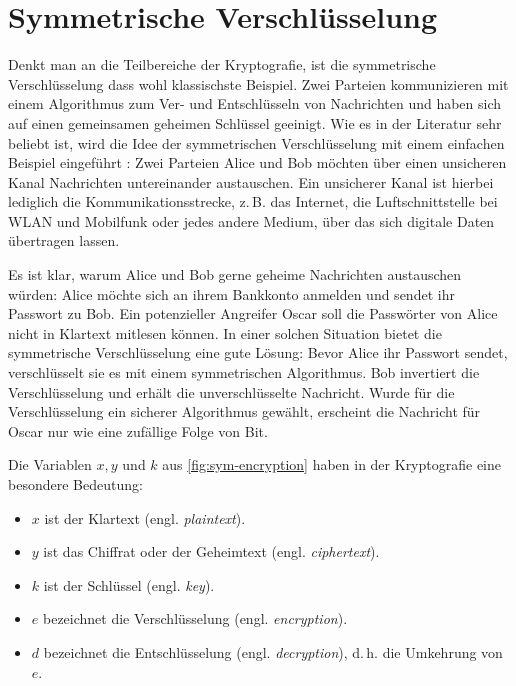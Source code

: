 \section{Symmetrische Verschlüsselung}
Denkt man an die Teilbereiche der Kryptografie, ist die symmetrische Verschlüsselung
dass wohl klassischste Beispiel. Zwei Parteien kommunizieren mit einem
Algorithmus zum Ver- und Entschlüsseln von Nachrichten und haben sich auf einen
gemeinsamen geheimen Schlüssel geeinigt. Wie es in der Literatur sehr beliebt ist,
wird die Idee der symmetrischen Verschlüsselung
mit einem einfachen Beispiel eingeführt \parencite[4-6]{BOOK:crypto}:
Zwei Parteien Alice und Bob möchten über einen unsicheren Kanal Nachrichten untereinander austauschen.
Ein unsicherer Kanal ist hierbei lediglich die Kommunikationsstrecke,
z.\,B. das Internet, die Luftschnittstelle bei WLAN und Mobilfunk
oder jedes andere Medium, über das sich digitale Daten übertragen lassen.
\newpage



\noindent
Es ist klar, warum Alice und Bob gerne geheime Nachrichten austauschen würden: Alice möchte sich an ihrem
Bankkonto anmelden und sendet ihr Passwort zu Bob. Ein potenzieller Angreifer Oscar
soll die Passwörter von Alice nicht in Klartext mitlesen können.
In einer solchen Situation bietet die symmetrische Verschlüsselung eine gute Lösung:
Bevor Alice ihr Passwort sendet, verschlüsselt sie es mit einem symmetrischen Algorithmus.
Bob invertiert die Verschlüsselung und erhält die unverschlüsselte Nachricht. Wurde für
die Verschlüsselung ein sicherer Algorithmus gewählt, erscheint die Nachricht für Oscar nur wie
eine zufällige Folge von Bit.



\noindent
Die Variablen $x, y$ und $k$ aus \autoref{fig:sym-encryption} haben in der
Kryptografie eine besondere Bedeutung:

\begin{itemize}
  \item $x$ ist der Klartext (engl. \textit{plaintext}).
  \item $y$ ist das Chiffrat oder der Geheimtext (engl. \textit{ciphertext}).
  \item $k$ ist der Schlüssel (engl. \textit{key}).
  \item $e$ bezeichnet die Verschlüsselung (engl. \textit{encryption}).
  \item $d$ bezeichnet die Entschlüsselung (engl. \textit{decryption}),
        d.\,h. die Umkehrung von $e$.
\end{itemize}

